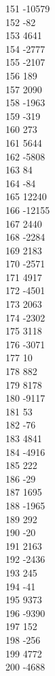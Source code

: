 { 151	-10579 \\
 152	-82 \\
 153	4641 \\
 154	-2777 \\
 155	-2107 \\
 156	189 \\
 157	2090 \\
 158	-1963 \\
 159	-319 \\
 160	273 \\
 161	5644 \\
 162	-5808 \\
 163	84 \\
 164	-84 \\
 165	12240 \\
 166	-12155 \\
 167	2440 \\
 168	-2284 \\
 169	2183 \\
 170	-2571 \\
 171	4917 \\
 172	-4501 \\
 173	2063 \\
 174	-2302 \\
 175	3118 \\
 176	-3071 \\
 177	10 \\
 178	882 \\
 179	8178 \\
 180	-9117 \\
 181	53 \\
 182	-76 \\
 183	4841 \\
 184	-4916 \\
 185	222 \\
 186	-29 \\
 187	1695 \\
 188	-1965 \\
 189	292 \\
 190	-20 \\
 191	2163 \\
 192	-2436 \\
 193	245 \\
 194	-41 \\
 195	9373 \\
 196	-9390 \\
 197	152 \\
 198	-256 \\
 199	4772 \\
 200	-4688 \\
}
